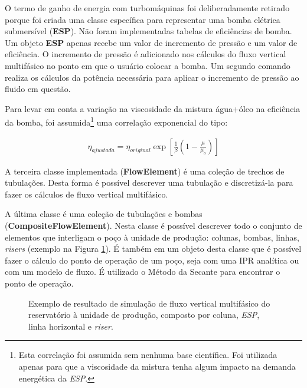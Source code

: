 \documentclass[final,5p]{elsarticle}
\numberwithin{equation}{section}
\begin{document}
        O termo de ganho de energia com turbomáquinas foi deliberadamente retirado porque foi criada uma classe específica para representar uma bomba elétrica submersível (\textbf{ESP}). Não foram implementadas tabelas de eficiências de bomba. Um objeto \textbf{ESP} apenas recebe um valor de incremento de pressão e um valor de eficiência. O incremento de pressão é adicionado nos cálculos do fluxo vertical multifásico no ponto em que o usuário colocar a bomba. Um segundo comando realiza os cálculos da potência necessária para aplicar o incremento de pressão ao fluido em questão.

        Para levar em conta a variação na viscosidade da mistura água+óleo na eficiência da bomba, foi assumida\footnote{Esta correlação foi assumida sem nenhuma base científica. Foi utilizada apenas para que a viscosidade da mistura tenha algum impacto na demanda energética da \emph{ESP}.} uma correlação exponencial do tipo:

        \begin{align}
            \eta_{ajustada} = \eta_{original} \exp \left[\frac{1}{\beta}\left(1-\frac{\mu}{\mu_o}\right) \right]
        \end{align}

        A terceira classe implementada (\textbf{FlowElement}) é uma coleção de trechos de tubulações. Desta forma é possível descrever uma tubulação e discretizá-la para fazer os cálculos de fluxo vertical multifásico.

        A última classe é uma coleção de tubulações e bombas (\textbf{CompositeFlowElement}). Nesta classe é possível descrever todo o conjunto de elementos que interligam o poço à unidade de produção: colunas, bombas, linhas, \emph{risers} (exemplo na Figura \ref{fig:flow}). É também em um objeto desta classe que é possível fazer o cálculo do ponto de operação de um poço, seja com uma IPR analítica ou com um modelo de fluxo. É utilizado o Método da Secante para encontrar o ponto de operação.

        \begin{figure}[hbt!]
            \caption{Exemplo de resultado de simulação de fluxo vertical multifásico do reservatório à unidade de produção, composto por coluna, \emph{ESP}, linha horizontal e \emph{riser}.}
            \label{fig:flow}
        \end{figure}
\end{document}
